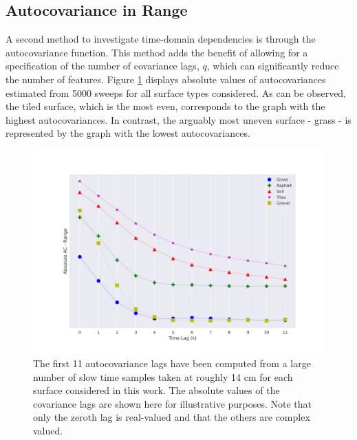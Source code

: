 \subsection{Autocovariance in Range}
\label{ACr}


A second method to investigate time-domain dependencies is through the autocovariance function. This method adds the benefit of allowing for a specification of the number of covariance lags, $q$, which can significantly reduce the number of features. Figure \ref{fig:autocorr_range} displays absolute values of autocovariances estimated from 5000 sweeps for all surface types considered. As can be observed, the tiled surface, which is the most even, corresponds to the graph with the highest autocovariances. In contrast, the arguably most uneven surface - grass - is represented by the graph with the lowest autocovariances.

\begin{figure}[h]
	\centering
	\includegraphics[scale=0.45]{figs_temp/features/autocorr_range.png}
	\caption{The first 11 autocovariance lags have been computed from a large number of slow time samples taken at roughly 14 cm for each surface considered in this work. The absolute values of the covariance lags are shown here for illustrative purposes. Note that only the zeroth lag is real-valued and that the others are complex valued.}
	\label{fig:autocorr_range}
\end{figure}

